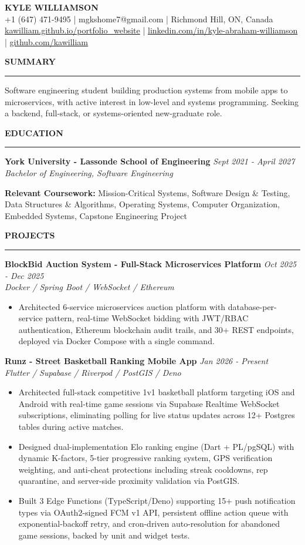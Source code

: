 \documentclass[10pt,letterpaper]{article}
\newcommand{\resumesection}[1]{%
  \vspace{5pt}
  \noindent\textsc{\textbf{\large #1}}
  \vspace{1pt}
  \hrule
  \vspace{2pt}
}
\newcommand{\resumeentry}[3]{%
  \noindent\textbf{#1} \hfill \textit{#2} \\
  \noindent\textit{#3}
}
\newcommand{\resumebullet}[1]{%
  \begin{itemize}[leftmargin=13pt,topsep=0pt,itemsep=0pt,partopsep=0pt]
    \item #1
  \end{itemize}
}
\begin{document}
\begin{center}
  {\textbf{\Huge KYLE WILLIAMSON}} \\[4pt]
  +1 (647) 471-9495 \;|\; mgkshome7@gmail.com \;|\; Richmond Hill, ON, Canada \\
  \href{https://kawilliam.github.io/portfolio_website}{kawilliam.github.io/portfolio\_website} \;|\;
  \href{https://linkedin.com/in/kyle-abraham-williamson}{linkedin.com/in/kyle-abraham-williamson} \;|\;
  \href{https://github.com/kawilliam}{github.com/kawilliam}
\end{center}

\resumesection{SUMMARY}
\noindent Software engineering student building production systems from mobile apps to microservices, with active interest in low-level and systems programming. Seeking a backend, full-stack, or systems-oriented new-graduate role.

\resumesection{EDUCATION}
\resumeentry{York University - Lassonde School of Engineering}{Sept 2021 - April 2027}{Bachelor of Engineering, Software Engineering}
\noindent\textbf{Relevant Coursework:} Mission-Critical Systems, Software Design \& Testing, Data Structures \& Algorithms, Operating Systems, Computer Organization, Embedded Systems, Capstone Engineering Project

\resumesection{PROJECTS}


\resumeentry{BlockBid Auction System - Full-Stack Microservices Platform}{Oct 2025 - Dec 2025}{Docker / Spring Boot / WebSocket / Ethereum}
\resumebullet{Architected 6-service microservices auction platform with database-per-service pattern, real-time WebSocket bidding with JWT/RBAC authentication, Ethereum blockchain audit trails, and 30+ REST endpoints, deployed via Docker Compose with a single command.}

\resumeentry{Runz - Street Basketball Ranking Mobile App}{Jan 2026 - Present}{Flutter / Supabase / Riverpod / PostGIS / Deno}
\resumebullet{Architected full-stack competitive 1v1 basketball platform targeting iOS and Android with real-time game sessions via Supabase Realtime WebSocket subscriptions, eliminating polling for live status updates across 12+ Postgres tables during active matches.}
\resumebullet{Designed dual-implementation Elo ranking engine (Dart + PL/pgSQL) with dynamic K-factors, 5-tier progressive ranking system, GPS verification weighting, and anti-cheat protections including streak cooldowns, rep quarantine, and server-side proximity validation via PostGIS.}
\resumebullet{Built 3 Edge Functions (TypeScript/Deno) supporting 15+ push notification types via OAuth2-signed FCM v1 API, persistent offline action queue with exponential-backoff retry, and cron-driven auto-resolution for abandoned game sessions, backed by unit and widget tests.}
\end{document}
